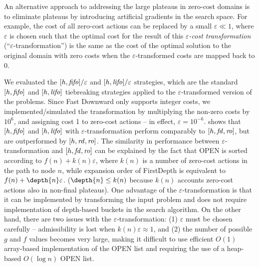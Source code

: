 An alternative approach to addressing the large plateaus in zero-cost domains is
to eliminate plateaus by introducing artificial gradients in the search space.
For example, the cost of all zero-cost actions can be replaced by a small $\varepsilon\ll 1$, where 
$\varepsilon$ is chosen such that the optimal cost for the result of  this \emph{$\varepsilon$-cost transformation} (``$\varepsilon$-transformation'') is the same as the cost of the optimal solution to the original domain with zero costs when the $\varepsilon$-transformed costs are mapped back to 0.

We evaluated the $[h,{\mbox{\textit{fifo}}}]/\varepsilon$ and $[h,{\mbox{\textit{lifo}}}]/\varepsilon$ strategies, which are the standard $[h,{\mbox{\textit{fifo}}}]$ and $[h,{\mbox{\textit{lifo}}}]$ tiebreaking strategies applied to  the $\varepsilon$-transformed version of the problems.
Since Fast Downward  only supports integer costs, we implemented/simulated the transformation by multiplying the non-zero costs by $10^6$, and assigning cost 1 to zero-cost actions -- in effect,  $\varepsilon=10^{-6}$.
 shows that $[h,{\mbox{\textit{fifo}}}]$ and $[h,{\mbox{\textit{lifo}}}]$ with $\varepsilon$-transformation
 perform comparably to $[h,{\mbox{\textit{fd}}},{\mbox{\textit{ro}}}]$, but are outperformed by $[h,{\mbox{\textit{rd}}},{\mbox{\textit{ro}}}]$.
% 
The similarity in performance between $\varepsilon$-transformation and $[h,{\mbox{\textit{fd}}},{\mbox{\textit{ro}}}]$ can be explained by the fact that  OPEN is sorted according to  $f(n)+k(n)\varepsilon$,
where $k(n)$ is a number of zero-cost actions in the path to node $n$,
while expansion order of FirstDepth is equivalent to $f(n)+\depth{n}\varepsilon$.
($\depth{n}\leq k(n)$ because $k(n)$ accounts zero-cost actions also in non-final plateaus).
% 
One advantage of the $\varepsilon$-transformation is that it can be implemented by transforming the input problem and does not require implementation of depth-based buckets in the search algorithm.
On the other hand, there are two issues with the $\varepsilon$-transformation:
(1) $\varepsilon$ must be chosen carefully -- admissibility is lost  when $k(n)\varepsilon\approx 1$, and
(2) the number of possible $g$ and $f$ values becomes very large, making it difficult to use efficient $O(1)$ array-based implementation of the OPEN list and requiring the use of a heap-based $O(\log n)$ OPEN list.



